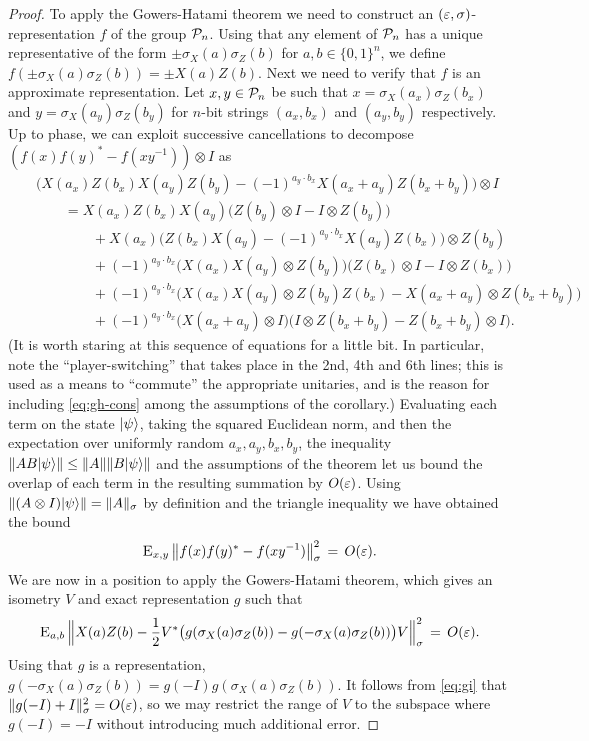 \begin{proof} 
To apply the Gowers-Hatami theorem we need to construct an $(\varepsilon,\sigma)$-representation $f$ of the group $\mathcal{P}_n$. Using that any element of $\mathcal{P}_n$ has a unique representative of the form $\pm \sigma_X(a)\sigma_Z(b)$ for $a,b\in\{0,1\}^n$, we define $f(\pm \sigma_X(a)\sigma_Z(b)) = \pm X(a)Z(b)$. Next we need to verify that $f$ is an approximate representation. Let $x,y\in \mathcal{P}_n$ be such that $x=\sigma_X(a_x)\sigma_Z(b_x)$ and $y=\sigma_X(a_y)\sigma_Z(b_y)$ for $n$-bit strings $(a_x,b_x)$ and $(a_y,b_y)$ respectively. Up to phase, we can exploit successive cancellations to decompose $(f(x)f(y)^*-f(xy^{-1}))\otimes I$ as
\begin{eqnarray*}
&&\big( X(a_x)Z(b_x)X(a_y)Z(b_y) -(-1)^{a_y\cdot b_x} X(a_x+a_y) Z(b_x+b_y)\big)\otimes I \\ 
&&\qquad =  X(a_x)Z(b_x)X(a_y)\big (Z(b_y)\otimes I - I\otimes Z(b_y)\big)\\
&& \qquad\qquad+ X(a_x)\big(Z(b_x)X(a_y) - (-1)^{a_y\cdot b_x} X(a_y)Z(b_x)\big)\otimes Z(b_y)\\
&& \qquad\qquad+(-1)^{a_y\cdot b_x} \big( X(a_x)X(a_y)\otimes Z(b_y)\big) \big( Z(b_x)\otimes I - I\otimes Z(b_x)\big)\\
&& \qquad\qquad+  (-1)^{a_y\cdot b_x}  \big( X(a_x)X(a_y)\otimes Z(b_y)Z(b_x) - X(a_x+a_y)\otimes Z(b_x+b_y)\big)\\
&& \qquad\qquad+  (-1)^{a_y\cdot b_x} \big(  X(a_x+a_y)\otimes I \big)\big(I\otimes Z(b_x+b_y) - Z(b_x+b_y)\otimes I\big).
\end{eqnarray*}
(It is worth staring at this sequence of equations for a little bit. In particular, note the ``player-switching'' that takes place in the 2nd, 4th and 6th lines; this is used as a means to ``commute'' the appropriate unitaries, and is the reason for including \eqref{eq:gh-cons} among the assumptions of the corollary.)
Evaluating each term on the state $|\psi\rangle$, taking the squared Euclidean norm, and then the expectation over uniformly random $a_x,a_y,b_x,b_y$, the inequality $\| AB|\psi\rangle\| \leq \|A\|\|B|\psi\rangle\|$ and the assumptions of the theorem let us bound the overlap of each term in the resulting summation by $O({\varepsilon})$. Using $\| (A\otimes I) |\psi\rangle\| = \|A\|_\sigma$ by definition and the triangle inequality we have obtained the bound
$$ \textsc{E}_{x,y}\,\big\|f(x)f(y)^* - f(xy^{-1})\big\|_\sigma^2 \,=\, O({\varepsilon}).$$
We are now in a position to apply the Gowers-Hatami theorem, which gives an isometry $V$ and exact representation $g$ such that
\begin{equation}\label{eq:gi}
\textsc{E}_{a,b}\,\Big\|  X(a)Z(b)- \frac{1}{2}V^*\big( g(\sigma_X(a)\sigma_Z(b))  -  g(-\sigma_X(a)\sigma_Z(b))\big)V\Big\|_\sigma^2 \,=\, O({\varepsilon}). 
\end{equation}
Using that $g$ is a representation, $g(-\sigma_X(a)\sigma_Z(b)) = g(-I)g(\sigma_X(a)\sigma_Z(b))$. It follows from \eqref{eq:gi} that $\|g(-I) + I \|_\sigma^2 = O({\varepsilon})$, so we may restrict the range of $V$ to the subspace where $g(-I)=-I$ without introducing much additional error. 
\end{proof}



